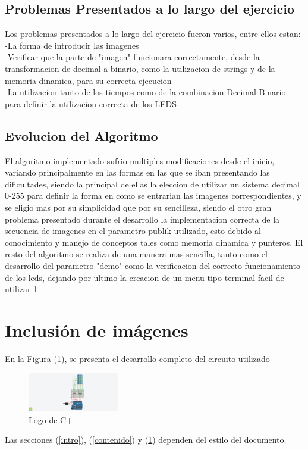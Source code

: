 \documentclass{article}
\begin{document}
\subsection{Problemas Presentados a lo largo del ejercicio}
Los problemas presentados a lo largo del ejercicio fueron varios, entre ellos estan:\\
-La forma de introducir las imagenes\\
-Verificar que la parte de "imagen" funcionara correctamente, desde la transformacion de decimal a binario, como la utilizacion de strings y de la memoria dinamica, para su correcta ejecucion\\
-La utilizacion tanto de los tiempos como de la combinacion Decimal-Binario para definir la utilizacion correcta de los LEDS
\subsection{Evolucion del Algoritmo}
El algoritmo implementado sufrio multiples modificaciones desde el inicio, variando principalmente en las formas en las que se iban presentando las dificultades, siendo la principal de ellas la eleccion de utilizar un sistema decimal 0-255 para definir la forma en como se entrarian las imagenes correspondientes, y se eligio mas por su simplicidad que por su sencilleza, siendo el otro gran problema presentado durante el desarrollo la implementacion correcta de la secuencia de imagenes en el parametro publik utilizado, esto debido al conocimiento y manejo de conceptos tales como memoria dinamica y punteros.
 El resto del algoritmo se realiza de una manera mas sencilla, tanto como el desarrollo del parametro "demo" como la verificacion del correcto funcionamiento de los leds, dejando por ultimo la creacion de un menu tipo terminal facil de utilizar
\ref{imagenes}
\section{Inclusión de imágenes} \label{imagenes}
En la Figura (\ref{fig:parcial1}), se presenta el desarrollo completo del circuito utilizado
\begin{figure}[h]
\includegraphics[width=4cm]{parcial1.png}
\centering
\caption{Logo de C++}
\label{fig:parcial1}
\end{figure}

Las secciones (\ref{intro}), (\ref{contenido}) y (\ref{imagenes}) dependen del estilo del documento.



\end{document}

